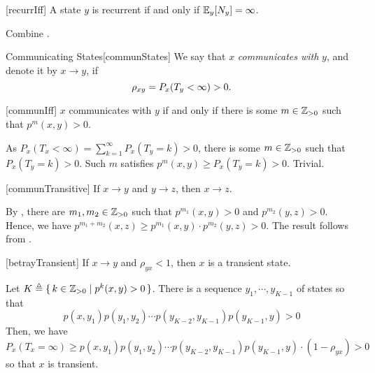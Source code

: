 \documentclass[../probability.tex]{subfiles}
\begin{document}
\begin{Lemma}{}[recurrIff]
    A state \(y\) is recurrent if and only if \(\mathbb{E}_y[N_y] = \infty\).
\end{Lemma}
\begin{myproof}[Proof]
    Combine .
\end{myproof}

\begin{Definition}{Communicating States}[communStates]
    We say that \(x\) \emph{communicates with} \(y\), and denote it by \(x \to y\),
    if
    \[
        \rho_{xy} = P_x(T_y < \infty) > 0\text.
    \]
\end{Definition}

\begin{Lemma}{}[communIff]
    \(x\) communicates with \(y\) if and only if
    there is some \(m \in \ZZ_{>0}\) such that \(p^m(x, y) > 0\).
\end{Lemma}
\begin{myproof}[Proof]\hfill
\begin{pftfae}[labelwidth=\widthof{(\(\Rightarrow\))}]
    \ii[(\(\Rightarrow\))]
    As \(P_x(T_x < \infty) = \sum_{k=1}^\infty P_x(T_y = k) > 0\),
    there is some \(m \in \ZZ_{>0}\) such that \(P_x(T_y = k) > 0\).
    Such \(m\) satisfies \(p^m(x,y) \ge P_x(T_y = k) > 0\).
    \ii[(\(\Leftarrow\))]
    Trivial.
    \qedhere
\end{pftfae}
\end{myproof}

\begin{Lemma}{}[communTransitive]
    If \(x \to y\) and \(y \to z\), then \(x \to z\).
\end{Lemma}
\begin{myproof}[Proof]
    By , there are \(m_1, m_2 \in \ZZ_{>0}\)
    such that \(p^{m_1}(x, y) > 0\) and \(p^{m_2}(y, z) > 0\).
    Hence, we have \(p^{m_1+m_2}(x,z) \ge p^{m_1}(x, y) \cdot p^{m_2}(y, z) > 0\).
    The result follows from .
\end{myproof}

\begin{Lemma}{}[betrayTransient]
    If \(x \to y\) and \(\rho_{yx} < 1\), then \(x\) is a transient state.
\end{Lemma}
\begin{myproof}[Proof]
    Let \(K \triangleq \{\,k \in \ZZ_{>0} \mid p^k(x, y) > 0\,\}\).
    There is a sequence \(y_1, \cdots, y_{K-1}\) of states so that
    \[
        p(x, y_1) p(y_1, y_2) \cdots p(y_{K-2}, y_{K-1}) p(y_{K-1}, y) > 0
    \]
    Then, we have
    \[
        P_x(T_x = \infty)
        \ge p(x, y_1) p(y_1, y_2) \cdots p(y_{K-2}, y_{K-1}) p(y_{K-1}, y) \cdot (1 - \rho_{yx}) > 0
    \]
    so that \(x\) is transient.
\end{myproof}
\end{document}
